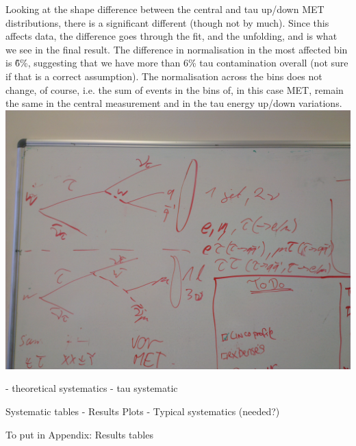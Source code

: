 Looking at the shape difference between the central and tau up/down MET distributions, there is a significant
different (though not by much). Since this affects data, the difference goes through the fit, and the
unfolding, and is what we see in the final result. The difference in normalisation in the most affected bin is
\~6\%, suggesting that we have more than 6\% tau contamination overall (not sure if that is a correct
assumption). The normalisation across the bins does not change, of course, i.e. the sum of events in the bins
of, in this case MET, remain the same in the central measurement and in the tau energy up/down variations.
\includegraphics[width=\textwidth]{Chapters/04_Analysis/04b_XSections/Images/IMG_20150219_160840.jpg}

			- theoretical systematics
			- tau systematic

Systematic tables			
	- Results Plots
	- Typical systematics (needed?)
	
	
To put in Appendix:
Results tables